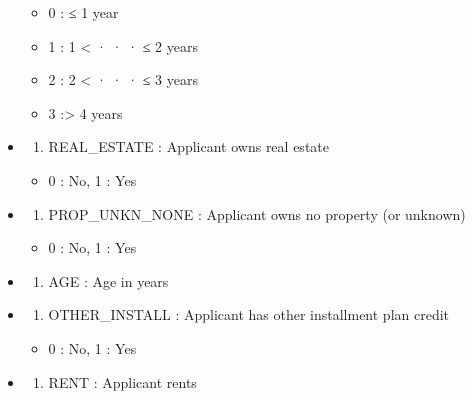 \documentclass[
]{article}
\providecommand{\tightlist}{%
  \setlength{\itemsep}{0pt}\setlength{\parskip}{0pt}}
\begin{document}
\begin{itemize}
  \begin{itemize}
  \tightlist
  \item
    0 : ≤ 1 year
  \item
    1 : 1 \textless{} · · · ≤ 2 years
  \item
    2 : 2 \textless{} · · · ≤ 3 years
  \item
    3 :\textgreater{} 4 years
  \end{itemize}
\item
  \begin{enumerate}
  \def\labelenumi{\arabic{enumi})}
  \setcounter{enumi}{20}
  \tightlist
  \item
    REAL\_ESTATE : Applicant owns real estate
  \end{enumerate}

  \begin{itemize}
  \tightlist
  \item
    0 : No, 1 : Yes
  \end{itemize}
\item
  \begin{enumerate}
  \def\labelenumi{\arabic{enumi})}
  \setcounter{enumi}{21}
  \tightlist
  \item
    PROP\_UNKN\_NONE : Applicant owns no property (or unknown)
  \end{enumerate}

  \begin{itemize}
  \tightlist
  \item
    0 : No, 1 : Yes
  \end{itemize}
\item
  \begin{enumerate}
  \def\labelenumi{\arabic{enumi})}
  \setcounter{enumi}{22}
  \tightlist
  \item
    AGE : Age in years
  \end{enumerate}
\item
  \begin{enumerate}
  \def\labelenumi{\arabic{enumi})}
  \setcounter{enumi}{23}
  \tightlist
  \item
    OTHER\_INSTALL : Applicant has other installment plan credit
  \end{enumerate}

  \begin{itemize}
  \tightlist
  \item
    0 : No, 1 : Yes
  \end{itemize}
\item
  \begin{enumerate}
  \def\labelenumi{\arabic{enumi})}
  \setcounter{enumi}{24}
  \tightlist
  \item
    RENT : Applicant rents
  \end{enumerate}


\end{itemize}
\end{document}
